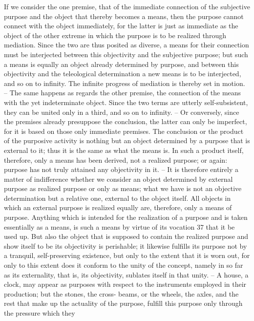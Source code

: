 If we consider the one premise, that of the immediate connection of the
subjective purpose and the object that thereby becomes a means, then the
purpose cannot connect with the object immediately, for the latter is just
as immediate as the object of the other extreme in which the purpose is
to be realized through mediation. Since the two are thus posited as diverse,
a means for their connection must be interjected between this objectivity
and the subjective purpose; but such a means is equally an object already
determined by purpose, and between this objectivity and the teleological
determination a new means is to be interjected, and so on to infinity. The
infinite progress of mediation is thereby set in motion. – The same happens
as regards the other premise, the connection of the means with the yet
indeterminate object. Since the two terms are utterly self-subsistent, they
can be united only in a third, and so on to infinity. – Or conversely,
since the premises already presuppose the conclusion, the latter can only be
imperfect, for it is based on those only immediate premises. The conclusion
or the product of the purposive activity is nothing but an object determined
by a purpose that is external to it; thus it is the same as what the means is.
In such a product itself, therefore, only a means has been derived, not a
realized purpose; or again: purpose has not truly attained any objectivity in
it. – It is therefore entirely a matter of indifference whether we consider
an object determined by external purpose as realized purpose or only as
means; what we have is not an objective determination but a relative one,
external to the object itself. All objects in which an external purpose is
realized equally are, therefore, only a means of purpose. Anything which
is intended for the realization of a purpose and is taken essentially as a
means, is such a means by virtue of its vocation 37 that it be used up. But
also the object that is supposed to contain the realized purpose and show
itself to be its objectivity is perishable; it likewise fulfills its purpose not by
a tranquil, self-preserving existence, but only to the extent that it is worn
out, for only to this extent does it conform to the unity of the concept,
namely in so far as its externality, that is, its objectivity, sublates itself in
that unity. – A house, a clock, may appear as purposes with respect to
the instruments employed in their production; but the stones, the cross-
beams, or the wheels, the axles, and the rest that make up the actuality
of the purpose, fulfill this purpose only through the pressure which they
